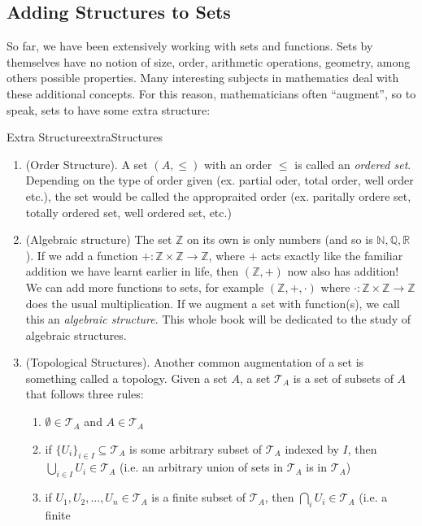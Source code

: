 \documentclass{book}
\newcommand{\N}{{\mathbb{N}}}
\newcommand{\Q}{{\mathbb{Q}}}
\newcommand{\R}{{\mathbb{R}}}
\newcommand{\Z}{{\mathbb{Z}}}
\newcommand{\sse}{\subseteq}
\newcommand{\rw}{\rightarrow}
\begin{document}
\begin{Answer}[ref={ex:functionsExercises}]
  \Question
\end{Answer}


\subsection{Adding Structures to Sets}

So far, we have been extensively working with sets and functions. Sets by themselves have no notion of size, order,
arithmetic operations, geometry, among others possible properties. Many interesting subjects in mathematics deal with
these additional concepts. For this reason, mathematicians often ``augment'', so to speak, sets to have some extra
structure:
\begin{example}{Extra Structure}{extraStructures}
	\begin{enumerate}
		\item (Order Structure). A set $(A, \le)$ with an order $\le$ is called an \emph{ordered set}. Depending on the
			type of order given (ex. partial oder, total order, well order etc.), the set would be called the appropraited
			order (ex. paritally ordere set, totally ordered set, well ordered set, etc.)
		\item (Algebraic structure) The set $\Z$ on its own is only numbers (and so is $\N, \Q, \R$). If we add
			a function $+: \Z \times \Z \rw \Z$, where $+$ acts exactly like the familiar addition we have learnt
			earlier in life, then $(\Z, +)$ now also has addition! We can add more functions to sets, for example $(\Z,
			+, \cdot)$ where $\cdot: \Z\times \Z
			\rw \Z$ does the usual multiplication. If we augment a set with function(s), we call this an \emph{algebraic structure}. This
			whole book will be dedicated to the study of algebraic structures.
		\item (Topological Structures). Another common augmentation of a set is something called a topology. Given a set
			$A$, a set
			$\mathcal{T}_A$ is a set of subsets of $A$ that follows three rules:
			\begin{enumerate}
				\item $\emptyset \in \mathcal{T}_A$ and $A \in \mathcal{T}_A$
				\item if  $\{U_i\}_{i \in I} \sse \mathcal{T}_A$ is some arbitrary subset of $\mathcal{T}_A$ indexed by
					$I$, then $\bigcup_{i \in I} U_i \in \mathcal{T}_A$ (i.e. an
					arbitrary union of sets in $\mathcal{T}_A$ is in $\mathcal{T}_A$)
				\item if $U_1, U_2, ..., U_n \in \mathcal{T}_A$ is a finite subset of $\mathcal{T}_A$, then $\bigcap_i U_i \in \mathcal{T}_A$ (i.e. a finite

\end{enumerate}
\end{enumerate}
\end{example}
\end{document}

